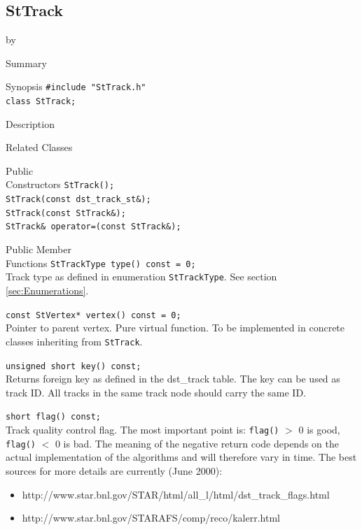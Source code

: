\documentclass[twoside]{article}
\newcommand{\entrylabel}[1]{\mbox{\textbf{{#1}}}\hfil}%
\newenvironment{entry}
{\begin{list}{}%
    {\renewcommand{\makelabel}{\entrylabel}%
     \setlength{\labelwidth}{90pt}%
     \setlength{\leftmargin}{\labelwidth}
     \advance\leftmargin by \labelsep%
      }%
    }%
  {\end{list}}
\newcommand{\Entrylabel}[1]%
{\raisebox{0pt}[1ex][0pt]{\makebox[\labelwidth][l]%
    {\parbox[t]{\labelwidth}{\hspace{0pt}\textbf{{#1}}}}}}
\newenvironment{Entry}%
{\renewcommand{\entrylabel}{\Entrylabel}\begin{entry}}%
  {\end{entry}}
\begin{document}
\subsection{StTrack}
\label{sec:StTrack}
\begin{Entry}
\item[Summary]
\item[Synopsis]
    \verb+#include "StTrack.h"+\\
    \verb+class StTrack;+\\
\item[Description]
\item[Related Classes]
\item[Public\\ Constructors]
    \verb+StTrack();+\\
    \verb+StTrack(const dst_track_st&);+\\
    \verb+StTrack(const StTrack&);+\\
    \verb+StTrack& operator=(const StTrack&);+\\
\item[Public Member\\ Functions]
    \verb+StTrackType type() const = 0;+\\
    Track type as defined in enumeration \texttt{StTrackType}.
    See section \ref{sec:Enumerations}.
    
    \verb+const StVertex* vertex() const = 0;+\\
    Pointer to parent vertex.
    Pure virtual function. To be implemented in
    concrete classes inheriting from \texttt{StTrack}.
    
    \verb+unsigned short key() const;+\\
    Returns foreign key as defined in the dst\_track table.
    The key can be used as track ID. All tracks in the same
    track node should carry the same ID. 
    
    \verb+short flag() const;+\\
    Track quality control flag.   The most important
    point is: \texttt{flag()} $>$ 0 is good, \texttt{flag()} $<$ 0 is bad.  The meaning
    of the negative return code depends on the actual implementation
    of the algorithms and will therefore vary in time.  The best
    sources for more details are currently (June 2000):    
    \begin{itemize}
    \item http://www.star.bnl.gov/STAR/html/all\_l/html/dst\_track\_flags.html
    \item http://www.star.bnl.gov/STARAFS/comp/reco/kalerr.html
    \end{itemize} 
     

\end{Entry}
\end{document}
